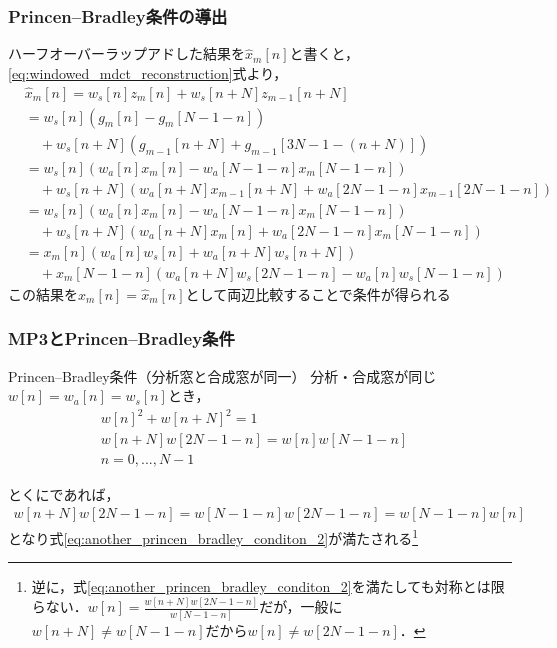 \documentclass[14pt,xcolor=dvipsnames,table,dvipdfmx]{beamer}
\begin{document}
\begin{frame}[c]
    \frametitle{Princen--Bradley条件の導出}
    ハーフオーバーラップアドした結果を$\hat{x}_{m}[n]$と書くと，\eqref{eq:windowed_mdct_reconstruction}式より，
    \footnotesize
    \begin{align*}
        &\hat{x}_{m}[n] = w_{s}[n]z_{m}[n] + w_{s}[n + N]z_{m-1}[n + N] \\
        &= w_{s}[n] (g_{m}[n] - g_{m}[N - 1 - n]) \\
        &\quad + w_{s}[n + N] (g_{m-1}[n + N] + g_{m-1}[3N - 1 - (n + N)]) \\
        &= w_{s}[n] (w_{a}[n] x_{m}[n] - w_{a}[N - 1 - n]x_{m}[N - 1 - n]) \\
        &\quad + w_{s}[n + N] (w_{a}[n + N] x_{m-1}[n + N] + w_{a}[2N - 1 - n]x_{m-1}[2N - 1 - n]) \\
        &= w_{s}[n] (w_{a}[n] x_{m}[n] - w_{a}[N - 1 - n]x_{m}[N - 1 - n]) \\
        &\quad + w_{s}[n + N] (w_{a}[n + N] x_{m}[n] + w_{a}[2N - 1 - n]x_{m}[N - 1 - n]) \\
        &= x_{m}[n](w_{a}[n] w_{s}[n] + w_{a}[n + N]w_{s}[n + N]) \\
        &\quad + x_{m}[N - 1 - n](w_{a}[n + N] w_{s}[2N - 1 - n] - w_{a}[n]w_{s}[N - 1 - n])
    \end{align*}
    \normalsize
    この結果を$x_{m}[n] = \hat{x}_{m}[n]$として両辺比較することで条件が得られる
\end{frame}

\begin{frame}[c]
    \frametitle{MP3とPrincen--Bradley条件}
    \begin{block}{Princen--Bradley条件（分析窓と合成窓が同一）}
        分析・合成窓が同じ$w[n] = w_{a}[n] = w_{s}[n]$とき，
        \begin{align}
            w[n]^{2} + w[n + N]^{2} = 1 & \label{eq:another_princen_bradley_conditon_1} \\
            w[n + N] w[2N - 1 - n] = w[n]w[N - 1 - n] & \label{eq:another_princen_bradley_conditon_2} \\
            n = 0,...,N-1 & \nonumber
        \end{align}
    \end{block}
    とくにであれば，
    \footnotesize
    \begin{align*}
        w[n + N] w[2N - 1 - n] = w[N - 1 - n]w[2N - 1 - n] = w[N - 1 - n]w[n]
    \end{align*}
    \normalsize
    となり式\eqref{eq:another_princen_bradley_conditon_2}が満たされる\footnote{逆に，式\eqref{eq:another_princen_bradley_conditon_2}を満たしても対称とは限らない．$w[n] = \frac{w[n + N]w[2N - 1 - n]}{w[N - 1 - n]}$だが，一般に$w[n + N] \neq w[N - 1 - n]$だから$w[n] \neq w[2N - 1 - n]$．}
\end{frame}
\end{document}
